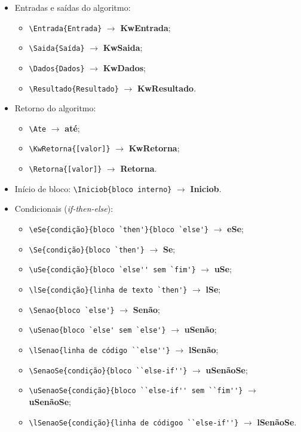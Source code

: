 \begin{itemize}
\item Entradas e saídas do algoritmo:
	\begin{itemize}
 	\item \verb|\Entrada{Entrada}| $\rightarrow$ \textbf{KwEntrada};
 	\item \verb|\Saida{Saída}| $\rightarrow$ \textbf{KwSaida};
 	\item \verb|\Dados{Dados}| $\rightarrow$ \textbf{KwDados};
 	\item \verb|\Resultado{Resultado}| $\rightarrow$ \textbf{KwResultado}.
 	\end{itemize}
\item Retorno do algoritmo:
	\begin{itemize}
 		\item \verb|\Ate| $\rightarrow$ \textbf{at\'{e}};
 		\item \verb|\KwRetorna{[valor]}| $\rightarrow$ \textbf{KwRetorna};
 		\item \verb|\Retorna{[valor]}| $\rightarrow$ \textbf{Retorna}.
 	\end{itemize}
\item Início de bloco: \verb|\Iniciob{bloco interno}| $\rightarrow$ \textbf{Iniciob}.
\item Condicionais (\textit{if-then-else}):
	\begin{itemize} 
		\item \verb|\eSe{condição}{bloco `then'}{bloco `else'}| $\rightarrow$ \textbf{eSe};
 		\item \verb|\Se{condição}{bloco `then'}| $\rightarrow$ \textbf{Se};
 		\item \verb|\uSe{condição}{bloco `else'' sem `fim'}| $\rightarrow$ \textbf{uSe};
 		\item \verb|\lSe{condição}{linha de texto `then'}| $\rightarrow$ \textbf{lSe};
 		\item \verb|\Senao{bloco `else'}| $\rightarrow$ \textbf{Senão};
 		\item \verb|\uSenao{bloco `else' sem `else'}| $\rightarrow$ \textbf{uSenão};
 		\item \verb|\lSenao{linha de código ``else''}| $\rightarrow$ \textbf{lSenão};
 		\item \verb|\SenaoSe{condição}{bloco ``else-if''}| $\rightarrow$ \textbf{uSenãoSe};
		\item \verb|\uSenaoSe{condição}{bloco ``else-if'' sem ``fim''}| $\rightarrow$ \textbf{uSenãoSe};
 		\item \verb|\lSenaoSe{condição}{linha de códigoo ``else-if''}| $\rightarrow$ \textbf{lSenãoSe}.

\end{itemize}
\end{itemize}
